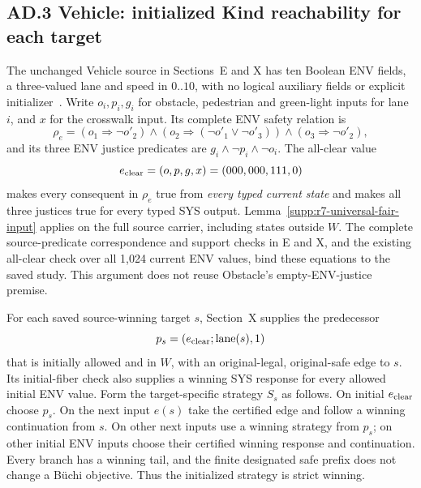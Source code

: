 \subsection*{AD.3 Vehicle: initialized Kind reachability for each target}
\label{supp:r7-vehicle-kind-targets}
The unchanged Vehicle source in Sections~E and X has ten Boolean ENV fields,
a three-valued lane and speed in $0..10$, with no logical auxiliary fields
or explicit initializer~\cite{vehicleartifact,vehiclewholeartifact}.
Write $o_i,p_i,g_i$ for obstacle, pedestrian and green-light inputs for
lane $i$, and $x$ for the crosswalk input. Its complete ENV safety relation is
\[
 \rho_e=
 (o_1\Rightarrow\neg o'_2)
 \land(o_2\Rightarrow(\neg o'_1\lor\neg o'_3))
 \land(o_3\Rightarrow\neg o'_2),
\]
and its three ENV justice predicates are $g_i\land\neg p_i\land\neg o_i$.
The all-clear value
\[
 e_{\rm clear}=(o,p,g,x)=(000,000,111,0)
\]
makes every consequent in $\rho_e$ true from \emph{every typed current state}
and makes all three justices true for every typed SYS output.
Lemma~\ref{supp:r7-universal-fair-input} applies on the full source carrier,
including states outside $W$. The complete source-predicate correspondence
and support checks in E and X, and the existing all-clear check over all
1,024 current ENV values, bind these equations to the saved study.
This argument does not reuse Obstacle's empty-ENV-justice premise.

For each saved source-winning target $s$, Section~X supplies the predecessor
\[
 p_s=(e_{\rm clear};\operatorname{lane}(s),1)
\]
that is initially allowed and in $W$, with an original-legal, original-safe
edge to $s$. Its initial-fiber check also supplies a winning SYS response
for every allowed initial ENV value. Form the target-specific strategy $S_s$
as follows. On initial $e_{\rm clear}$ choose $p_s$. On the next input $e(s)$
take the certified edge and follow a winning continuation from $s$.
On other next inputs use a winning strategy from $p_s$; on other initial
ENV inputs choose their certified winning response and continuation.
Every branch has a winning tail, and the finite designated safe prefix
does not change a B\"uchi objective. Thus the initialized strategy is strict
winning.

